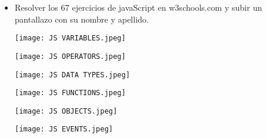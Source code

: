 \documentclass{article}
\begin{document}
\begin{itemize}
            \item Resolver los 67 ejercicios de javaScript en w3schools.com y subir un pantallazo con su nombre y apellido.

            \newline \newline \newline
            \newline \newline \newline
            \texttt{[image: JS VARIABLES.jpeg]}

            \newline \newline \newline
            \newline \newline \newline
            \texttt{[image: JS OPERATORS.jpeg]}

            \newline \newline \newline
            \newline \newline \newline
            \texttt{[image: JS DATA TYPES.jpeg]}

            \newline \newline \newline
            \newline \newline \newline
            \texttt{[image: JS FUNCTIONS.jpeg]}

            \newline \newline \newline
            \newline \newline \newline
            \texttt{[image: JS OBJECTS.jpeg]}

            \newline \newline \newline
            \newline \newline \newline
            \texttt{[image: JS EVENTS.jpeg]}


\end{itemize}
\end{document}
